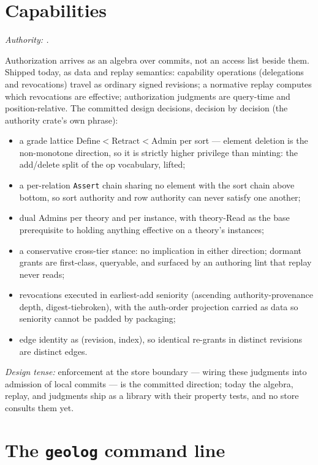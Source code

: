 \section{Capabilities}
\label{sec:gr-caps}

\emph{Authority: .}

Authorization arrives as an algebra over commits, not an access
list beside them. Shipped today, as data and replay semantics:
capability operations (delegations and revocations) travel as
ordinary signed revisions; a normative replay computes which revocations are
effective; authorization judgments are query-time and
position-relative. The committed design decisions, decision by decision (the authority
crate's own phrase):

\begin{itemize}
\item a grade lattice
$\text{Define} < \text{Retract} < \text{Admin}$ per sort — element
deletion is the non-monotone direction, so it is strictly higher
privilege than minting: the add/delete split of the op vocabulary,
lifted;
\item a per-relation \texttt{Assert} chain sharing no element with
the sort chain above bottom, so sort authority and row authority can
never satisfy one another;
\item dual Admins per theory and per instance, with theory-Read as
the base prerequisite to holding anything effective on a theory's
instances;
\item a conservative cross-tier stance: no implication in either
direction; dormant grants are first-class, queryable, and surfaced by
an authoring lint that replay never reads;
\item revocations executed in earliest-add seniority (ascending
authority-provenance depth, digest-tiebroken), with the auth-order
projection carried as data so seniority cannot be padded by
packaging;
\item edge identity as (revision, index), so identical re-grants in
distinct revisions are distinct edges.
\end{itemize}

\noindent \emph{Design
tense:} enforcement at the store boundary — wiring these judgments
into admission of local commits — is the committed direction; today
the algebra, replay, and judgments ship as a library with their
property tests, and no store consults them yet.

\section{The \texttt{geolog} command line}
\label{sec:gr-cli}

